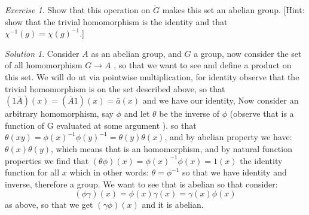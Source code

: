 \documentclass[notitlepage]{article}
\theoremstyle{definition}
\theoremstyle{remark}
\newtheorem{exc}{Exercise}
\newtheorem*{sol}{Solution}
\newcommand{\inv}{^{-1}}
\begin{document}
\begin{exc}
	Show that this operation on $  \check{G} $ makes this set an abelian group. [Hint: show that the trivial homomorphism is the identity and that $ \chi^{-1}(g) = \chi(g)^{-1}. $]
\end{exc}

\begin{sol}
	Consider $ A $ as an abelian group, and $ G $ a group, now consider the set of all homomorphism $ G \rightarrow A $ , so that we want to see and define a product on this set. We will do ut via pointwise multiplication, for identity observe that the trivial homomorphism is on the set described above, so that $ (1 \bar{A})(x) = (\bar{A} 1 )(x) = \bar{a}(x) $ and we have our identity, Now consider an arbitrary homomorphism, say $ \phi $ and let $ \theta $ be the inverse of $ \phi $ (observe that is a function of G evaluated at some argument ). so that $ \theta(xy) = \phi(x)\inv \phi(y)\inv = \theta(y) \theta(x)$, and by abelian property we have: $ \theta(x) \theta(y) $, which means that is an homomorphism, and by natural function properties we find that $ (\theta \phi) (x) = \phi(x)\inv \phi(x) = 1(x) $ the identity function for all $ x $ which in other words:  $ \theta = \phi\inv  $ so that we have identity and inverse, therefore a group. We want to see that is abelian so that consider:
	\[ (\phi \gamma )(x) = \phi(x)\gamma(x) = \gamma(x) \phi (x) \] as above, so that we get $  (\gamma \phi)(x) 
	 $ and it is abelian.
	 \end{sol}
\end{document}

